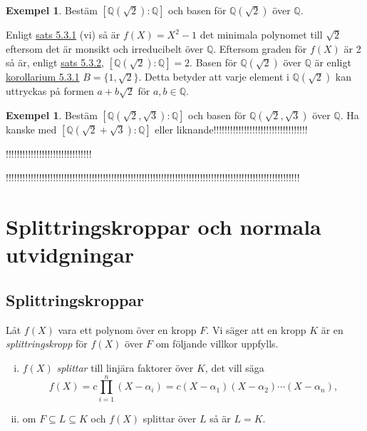 \documentclass{article}
\theoremstyle{definition}
\newtheorem{exmp}[thm]{Exempel}
\begin{document}
\begin{exmp}
  Bestäm $[\mathbb{Q}(\sqrt{2}): \mathbb{\mathbb{Q}}]$ och basen för $\mathbb{Q}(\sqrt{2})$ över $\mathbb{Q}$.

  Enligt \hyperlink{minpol}{sats 5.3.1} (vi) så är $f(X) = X^2-1$ det minimala polynomet till $\sqrt{2}$ eftersom det är monsikt och irreducibelt över $\mathbb{Q}$. 
  Eftersom graden för $f(X)$ är 2 så är, enligt \hyperlink{5.3.2}{sats 5.3.2}, $[\mathbb{Q}(\sqrt{2}): \mathbb{\mathbb{Q}}] = 2.$ Basen för $\mathbb{Q}(\sqrt{2})$ över $\mathbb{Q}$
  är enligt \hyperlink{kol5.3.1}{korollarium 5.3.1} $B = \{1, \sqrt{2}\}$. Detta betyder att varje element i $\mathbb{Q}(\sqrt{2})$ kan uttryckas 
  på formen $a + b\sqrt{2}$ för $a, b \in \mathbb{Q}.$

\end{exmp}

\begin{exmp}
  Bestäm $[\mathbb{Q}(\sqrt{2}, \sqrt{3}): \mathbb{\mathbb{Q}}]$ och basen för $\mathbb{Q}(\sqrt{2}, \sqrt{3})$ över $\mathbb{Q}$.
  Ha kanske med $[\mathbb{Q}(\sqrt{2} + \sqrt{3}): \mathbb{\mathbb{Q}}]$ eller liknande!!!!!!!!!!!!!!!!!!!!!!!!!!!!!!!!!!
  
  !!!!!!!!!!!!!!!!!!!!!!!!!!!!!!!

  !!!!!!!!!!!!!!!!!!!!!!!!!!!!!!!!!!!!!!!!!!!!!!!!!!!!!!!!!!!!!!!!!!!!!!!!!!!!!!!!!!!!!!!!!!!!!!!!!!!!!!!!!!
\end{exmp}

\section{Splittringskroppar och normala utvidgningar}
\subsection{Splittringskroppar}
\begin{mydef}{}{}
  Låt $f(X)$ vara ett polynom över en kropp $F$. Vi säger att en kropp $K$ är en \textit{splittringskropp} för $f(X)$ över $F$ om följande villkor uppfylls. 
  \begin{enumerate}[(i)]
    \item $f(X)$ \textit{splittar} till linjära faktorer över $K$, det vill säga 
    \[f(X) = c \prod_{i=1}^n (X- \alpha_i) = c(X-\alpha_1)(X-\alpha_2)\cdots (X-\alpha_n),\]
    \item om $F \subseteq L \subseteq K$ och $f(X)$ splittar över $L$ så är $L = K.$
  \end{enumerate}
\end{mydef}
\end{document}
